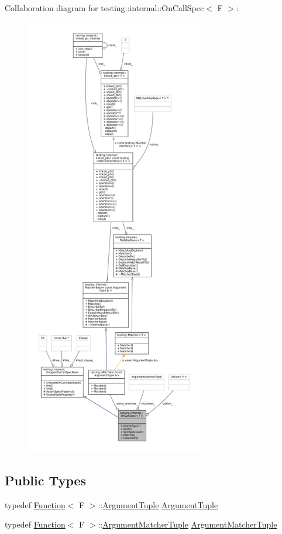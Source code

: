 Collaboration diagram for testing\+:\+:internal\+:\+:On\+Call\+Spec$<$ F $>$\+:
\nopagebreak
\begin{figure}[H]
\begin{center}
\leavevmode
\includegraphics[height=550pt]{classtesting_1_1internal_1_1OnCallSpec__coll__graph}
\end{center}
\end{figure}
\subsection*{Public Types}
\begin{DoxyCompactItemize}
\item 
typedef \hyperlink{structtesting_1_1internal_1_1Function}{Function}$<$ F $>$\+::\hyperlink{classtesting_1_1internal_1_1OnCallSpec_a70ffab8b915b7b48a90f5ce256da806f}{Argument\+Tuple} \hyperlink{classtesting_1_1internal_1_1OnCallSpec_a70ffab8b915b7b48a90f5ce256da806f}{Argument\+Tuple}
\item 
typedef \hyperlink{structtesting_1_1internal_1_1Function}{Function}$<$ F $>$\+::\hyperlink{classtesting_1_1internal_1_1OnCallSpec_a3240f159f0a9d8cda208bc256da35074}{Argument\+Matcher\+Tuple} \hyperlink{classtesting_1_1internal_1_1OnCallSpec_a3240f159f0a9d8cda208bc256da35074}{Argument\+Matcher\+Tuple}
\end{DoxyCompactItemize}
